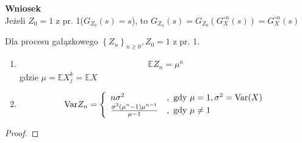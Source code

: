 \textbf{Wniosek}\\
Jeżeli $ Z_0=1 $ z pr. 1($ G_{Z_0}(s)=s $), to $ G_{Z_n}(s)=G_{Z_0}\left(G_X^{\circ n}(s)\right)=G_X^{\circ n}(s) $
\begin{twr}
Dla procesu gałązkowego $ \left\{Z_n\right\} _{n\ge 0},Z_0=1$ z pr. 1.
\begin{enumerate}
\item 
\begin{gather*}
\mathbb E Z_n=\mu^n
\end{gather*}
gdzie $ \mu=\mathbb E X_j^k=\mathbb E X $
\item 
\begin{gather*}
\text{Var} Z_n=
\left \{
\begin{array}{ll}
n\sigma^2&,\text{ gdy }\mu=1,\sigma^2=\text{Var} (X)\\
\frac{\sigma^2(\mu^n-1)\mu^{n-1}}{\mu-1}&,\text{ gdy }\mu\neq 1
\end{array}
\right .
\end{gather*}
\end{enumerate}
\begin{proof}
\end{proof}
\end{twr}
